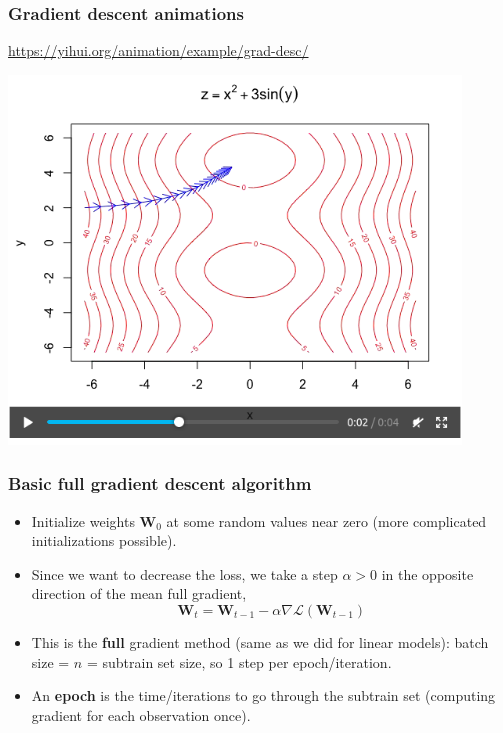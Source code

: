 \documentclass{beamer}
\begin{document}
\begin{frame}
  \frametitle{Gradient descent animations}
  \url{https://yihui.org/animation/example/grad-desc/}

  \includegraphics[width=0.9\textwidth]{screenshot-gradient-descent}
\end{frame}

\begin{frame}[fragile]
  \frametitle{Basic full gradient descent algorithm}
  \begin{itemize}
  \item Initialize weights $\mathbf W_0$ at some random values near
    zero (more complicated initializations possible).
  \item Since we want to decrease the loss, we take a step $\alpha>0$ in the
    opposite direction of the mean full gradient,
  $$
\mathbf W_t = \mathbf W_{t-1} - \alpha \nabla \mathcal L(\mathbf W_{t-1})
$$
\item This is the \textbf{full} gradient method (same as we did for
  linear models): batch size = $n$ =
  subtrain set size, so 1 step per epoch/iteration.
\item An \textbf{epoch} is the time/iterations to go through the
  subtrain set (computing gradient for each observation once).
\end{itemize}

\end{frame}
\end{document}
